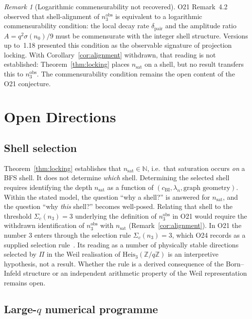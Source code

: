 \documentclass[12pt,a4paper]{article}
\theoremstyle{remark}
\newtheorem{remark}[theorem]{Remark}
\newcommand{\cchi}{c_{\mathrm{BI}}}
\newcommand{\nsat}{n_{\mathrm{sat}}}
\newcommand{\nobs}{n^{\mathrm{obs}}_3}
\newcommand{\dpair}{\delta_{\mathrm{pair}}}
\newcommand{\Heis}{\mathrm{Heis}_3(\mathbb{Z}/q\mathbb{Z})}
\begin{document}
  \begin{remark}[Logarithmic commensurability not recovered]
    \label{rem:log_commensurability}
    O21 Remark~4.2~\cite{Beau2026a25} observed that shell-alignment of $\nobs$ is equivalent to a
    logarithmic commensurability condition: the local decay rate $\dpair$ and the amplitude
    ratio $A = q^2 \sigma(n_0)/9$ must be commensurate with the integer shell structure.
    Versions up to~1.18 presented this condition as the observable signature of projection
    locking.
    With Corollary~\ref{cor:alignment} withdrawn, that reading is not established:
    Theorem~\ref{thm:locking} places $\nsat$ on a shell, but no result transfers this to $\nobs$.
    The commensurability condition remains the open content of the O21 conjecture.
  \end{remark}

  \section{Open Directions}
  \label{sec:open}

  \subsection{Shell selection}
    \label{subsec:o23}

    Theorem~\ref{thm:locking} establishes that $\nsat \in \mathbb{N}$, i.e.\ that saturation
    occurs \emph{on} a BFS shell.
    It does not determine \emph{which} shell.
    Determining the selected shell requires identifying the depth $\nsat$ as a function of
    $(\cchi, \lambda_n, \text{graph geometry})$.
    Within the stated model, the question ``why a shell?'' is answered for $\nsat$, and the
    question ``why \emph{this} shell?'' becomes well-posed.
    Relating that shell to the threshold $\Sigma_c(n_3) = 3$ underlying the definition of
    $\nobs$ in O21 would require the withdrawn identification of $\nobs$ with $\nsat$
    (Remark~\ref{cor:alignment}).
    In O21 the number 3 enters through the selection rule $\Sigma_c(n_3) = 3$, which O24
    records as a supplied selection rule~\cite{Beau2026a28}.
    Its reading as a number of physically stable directions selected by $\Pi$ in the Weil
    realisation of $\Heis$ is an interpretive hypothesis, not a result.
    Whether the rule is a derived consequence of the Born--Infeld structure or an independent
    arithmetic property of the Weil representation remains open.

  \subsection{Large-$q$ numerical programme}
    \label{subsec:numerical}
\end{document}
